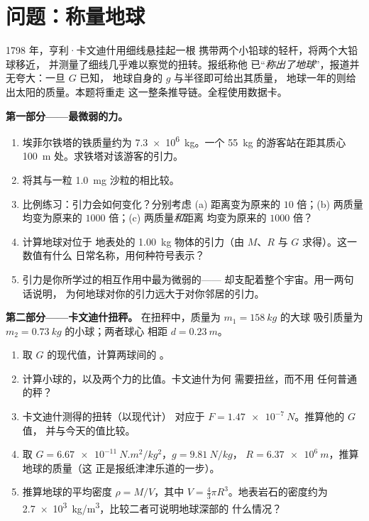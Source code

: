 \section{问题：称量地球}

\begin{problem}
\label{pb:g10:universal-gravitation:1}
1798 年，亨利·卡文迪什用细线悬挂起一根
携带两个小铅球的轻杆，将两个大铅球移近，
并测量了细线几乎难以察觉的扭转。报纸称他
已“\emph{称出了地球}”，报道并无夸大：一旦 $G$ 已知，
地球自身的 $g$ 与半径即可给出其质量，
地球一年的则给出太阳的质量。本题将重走
这一整条推导链。全程使用数据卡。

\medskip
\noindent\textbf{第一部分——最微弱的力。}
\begin{enumerate}
  \item 埃菲尔铁塔的铁质量约为 \qty{7.3e6}{kg}。一个
        \qty{55}{kg} 的游客站在距其质心 \qty{100}{m}
        处。求铁塔对该游客的引力。
  \item 将其与一粒 \qty{1.0}{mg} 沙粒的相比较。
  \item 比例练习：引力会如何变化？分别考虑
        (a) 距离变为原来的 $10$ 倍；(b) 两质量
        均变为原来的 $1000$ 倍；(c) 两质量\emph{和}距离
        均变为原来的 $1000$ 倍？
  \item 计算地球对位于
        地表处的 \qty{1.00}{kg} 物体的引力（由 $M$、$R$ 与 $G$ 求得）。这一数值有什么
        日常名称，用何种符号表示？
  \item 引力是你所学过的相互作用中最为微弱的——
        却支配着整个宇宙。用一两句话说明，
        为何地球对你的引力远大于对你邻居的引力。
\end{enumerate}

\medskip
\noindent\textbf{第二部分——卡文迪什扭秤。}
在扭秤中，质量为 $m_1 = \qty{158}{kg}$ 的大球
吸引质量为 $m_2 = \qty{0.73}{kg}$ 的小球；两者球心
相距 $d = \qty{0.23}{m}$。
\begin{enumerate}[resume]
  \item 取 $G$ 的现代值，计算两球间的
        。
  \item 计算小球的，以及两个力的比值。卡文迪什为何
        需要扭丝，而不用
        任何普通的秤？
  \item 卡文迪什测得的扭转（以现代计）
        对应于 $F = \qty{1.47e-7}{N}$。推算他的 $G$ 值，
        并与今天的值比较。
  \item 取 $G = \qty{6.67e-11}{N.m^2/kg^2}$，$g = \qty{9.81}{N/kg}$，
        $R = \qty{6.37e6}{m}$，推算地球的质量（这
        正是报纸津津乐道的一步）。
  \item 推算地球的平均密度 $\rho = M / V$，其中
        $V = \frac43 \pi R^3$。地表岩石的密度约为
        \qty{2.7e3}{kg/m^3}，比较二者可说明地球深部的
        什么情况？
\end{enumerate}


\end{problem}
